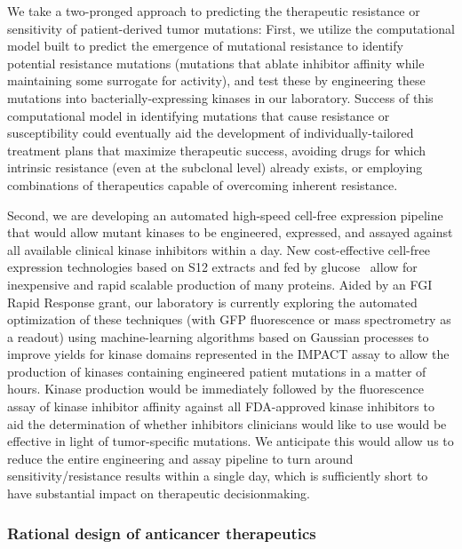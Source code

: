 \documentclass[10pt]{article}
\begin{document}
We take a two-pronged approach to predicting the therapeutic resistance or sensitivity of patient-derived tumor mutations:
First, we utilize the computational model built to predict the emergence of mutational resistance to identify potential resistance mutations (mutations that ablate inhibitor affinity while maintaining some surrogate for activity), and test these by engineering these mutations into bacterially-expressing kinases in our laboratory.
Success of this computational model in identifying mutations that cause resistance or susceptibility could eventually aid the development of individually-tailored treatment plans that maximize therapeutic success, avoiding drugs for which intrinsic resistance (even at the subclonal level) already exists, or employing combinations of therapeutics capable of overcoming inherent resistance.

Second, we are developing an automated high-speed cell-free expression pipeline that would allow mutant kinases to be engineered, expressed, and assayed against all available clinical kinase inhibitors within a day.
New cost-effective cell-free expression technologies based on S12 extracts and fed by glucose~\cite{kim_simple_2006,calhoun_economical_2008} allow for inexpensive and rapid scalable production of many proteins.
Aided by an FGI Rapid Response grant, our laboratory is currently exploring the automated optimization of these techniques (with GFP fluorescence or mass spectrometry as a readout) using machine-learning algorithms based on Gaussian processes to improve yields for kinase domains represented in the IMPACT assay to allow the production of kinases containing engineered patient mutations in a matter of hours.
Kinase production would be immediately followed by the fluorescence assay of kinase inhibitor affinity against all FDA-approved kinase inhibitors to aid the determination of whether inhibitors clinicians would like to use would be effective in light of tumor-specific mutations.
We anticipate this would allow us to reduce the entire engineering and assay pipeline to turn around sensitivity/resistance results within a single day, which is sufficiently short to have substantial impact on therapeutic decisionmaking.

\vspace{-0.3cm}
\subsubsection*{Rational design of anticancer therapeutics}
\vspace{-0.3cm}
\end{document}
